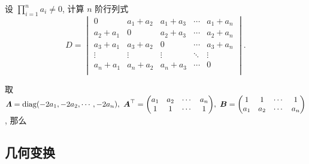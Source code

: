 \begin{example}[2008 上海交通大学]
    \scriptsize\linespread{0.8}
    设 $\displaystyle\prod_{i=1}^{n}a_i\neq0$, 计算 $n$ 阶行列式
    $$D=\begin{vmatrix}
            0       & a_1+a_2 & a_1+a_3 & \cdots & a_1+a_n \\
            a_2+a_1 & 0       & a_2+a_3 & \cdots & a_2+a_n \\
            a_3+a_1 & a_3+a_2 & 0       & \cdots & a_3+a_n \\
            \vdots  & \vdots  & \vdots  & \ddots & \vdots  \\
            a_n+a_1 & a_n+a_2 & a_n+a_3 & \cdots & 0       \\
        \end{vmatrix}.$$
\end{example}
\begin{solution}
    取 $\vb*{\varLambda}=\mathrm{diag} (-2a_1,-2a_2,\cdots,-2a_n),~\vb*{A}^\top=\mqty(a_1&a_2&\cdots& a_n\\1&1&\cdots& 1),~\vb*{B}=\mqty(1&1&\cdots& 1\\a_1&a_2&\cdots& a_n)$, 那么
\end{solution}

\subsection{几何变换}

